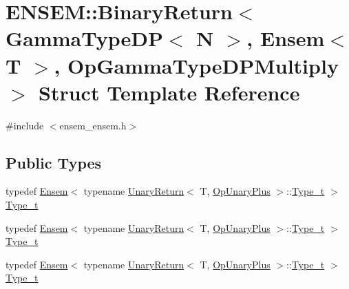 \hypertarget{structENSEM_1_1BinaryReturn_3_01GammaTypeDP_3_01N_01_4_00_01Ensem_3_01T_01_4_00_01OpGammaTypeDPMultiply_01_4}{}\section{E\+N\+S\+EM\+:\+:Binary\+Return$<$ Gamma\+Type\+DP$<$ N $>$, Ensem$<$ T $>$, Op\+Gamma\+Type\+D\+P\+Multiply $>$ Struct Template Reference}
\label{structENSEM_1_1BinaryReturn_3_01GammaTypeDP_3_01N_01_4_00_01Ensem_3_01T_01_4_00_01OpGammaTypeDPMultiply_01_4}


{\ttfamily \#include $<$ensem\+\_\+ensem.\+h$>$}

\subsection*{Public Types}
\begin{DoxyCompactItemize}
\item 
typedef \mbox{\hyperlink{classENSEM_1_1Ensem}{Ensem}}$<$ typename \mbox{\hyperlink{structENSEM_1_1UnaryReturn}{Unary\+Return}}$<$ T, \mbox{\hyperlink{structENSEM_1_1OpUnaryPlus}{Op\+Unary\+Plus}} $>$\+::\mbox{\hyperlink{structENSEM_1_1BinaryReturn_3_01GammaTypeDP_3_01N_01_4_00_01Ensem_3_01T_01_4_00_01OpGammaTypeDPMultiply_01_4_a73cf3e27d5385f365badeb472933415f}{Type\+\_\+t}} $>$ \mbox{\hyperlink{structENSEM_1_1BinaryReturn_3_01GammaTypeDP_3_01N_01_4_00_01Ensem_3_01T_01_4_00_01OpGammaTypeDPMultiply_01_4_a73cf3e27d5385f365badeb472933415f}{Type\+\_\+t}}
\item 
typedef \mbox{\hyperlink{classENSEM_1_1Ensem}{Ensem}}$<$ typename \mbox{\hyperlink{structENSEM_1_1UnaryReturn}{Unary\+Return}}$<$ T, \mbox{\hyperlink{structENSEM_1_1OpUnaryPlus}{Op\+Unary\+Plus}} $>$\+::\mbox{\hyperlink{structENSEM_1_1BinaryReturn_3_01GammaTypeDP_3_01N_01_4_00_01Ensem_3_01T_01_4_00_01OpGammaTypeDPMultiply_01_4_a73cf3e27d5385f365badeb472933415f}{Type\+\_\+t}} $>$ \mbox{\hyperlink{structENSEM_1_1BinaryReturn_3_01GammaTypeDP_3_01N_01_4_00_01Ensem_3_01T_01_4_00_01OpGammaTypeDPMultiply_01_4_a73cf3e27d5385f365badeb472933415f}{Type\+\_\+t}}
\item 
typedef \mbox{\hyperlink{classENSEM_1_1Ensem}{Ensem}}$<$ typename \mbox{\hyperlink{structENSEM_1_1UnaryReturn}{Unary\+Return}}$<$ T, \mbox{\hyperlink{structENSEM_1_1OpUnaryPlus}{Op\+Unary\+Plus}} $>$\+::\mbox{\hyperlink{structENSEM_1_1BinaryReturn_3_01GammaTypeDP_3_01N_01_4_00_01Ensem_3_01T_01_4_00_01OpGammaTypeDPMultiply_01_4_a73cf3e27d5385f365badeb472933415f}{Type\+\_\+t}} $>$ \mbox{\hyperlink{structENSEM_1_1BinaryReturn_3_01GammaTypeDP_3_01N_01_4_00_01Ensem_3_01T_01_4_00_01OpGammaTypeDPMultiply_01_4_a73cf3e27d5385f365badeb472933415f}{Type\+\_\+t}}
\end{DoxyCompactItemize}


